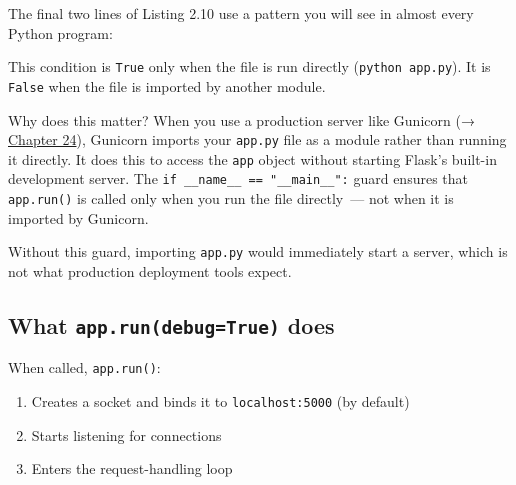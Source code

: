 The final two lines of Listing 2.10 use a pattern you will see in almost every Python program:

\begin{codebox}[short]

\begin{Shaded}
\begin{Highlighting}[]
  \OperatorTok{==} \NormalTok{:}
\OperatorTok{=}\NormalTok{)}
\end{Highlighting}
\end{Shaded}

\end{codebox}

\noindent{}This condition is \texttt{True} only when the file is run directly (\texttt{python\ app.py}). It is \texttt{False} when the file is imported by another module.

Why does this matter? When you use a production server like Gunicorn (→ \hyperref[ch:24-process-startup]{Chapter 24}), Gunicorn imports your \texttt{app.py} file as a module rather than running it directly. It does this to access the \texttt{app} object without starting Flask's built-in development server. The \texttt{if\ \_}\allowbreak{}\texttt{\_}\allowbreak{}\texttt{name\_}\allowbreak{}\texttt{\_}\allowbreak{}\texttt{\ =}\allowbreak{}\texttt{=}\allowbreak{}\texttt{\ "\_}\allowbreak{}\texttt{\_}\allowbreak{}\texttt{main\_}\allowbreak{}\texttt{\_}\allowbreak{}\texttt{":} guard ensures that \texttt{app.run()} is called only when you run the file directly~--- not when it is imported by Gunicorn.

Without this guard, importing \texttt{app.py} would immediately start a server, which is not what production deployment tools expect.

\subsection*{\texorpdfstring{What \texttt{app.run(debug=}\allowbreak{}\texttt{True)} does}{What  does}}\label{02-runtime-initialization:what-apprundebugtrue-does}

When called, \texttt{app.run()}:

\begin{enumerate}
\def\labelenumi{\arabic{enumi}.}
\tightlist
\item
  Creates a socket and binds it to \texttt{localhost:5000} (by default)
\item
  Starts listening for connections
\item
  Enters the request-handling loop
\end{enumerate}

